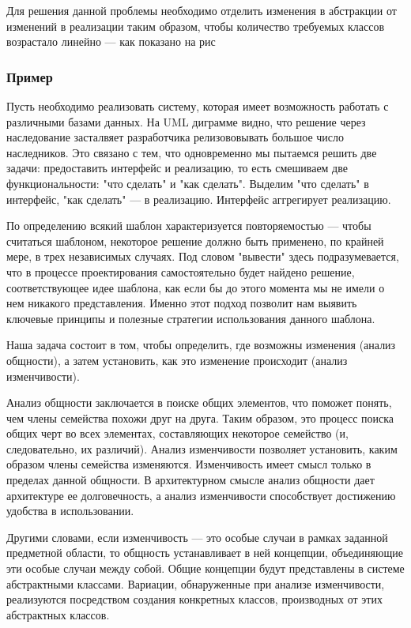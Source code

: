 \documentclass[10pt]{article}
\begin{document}
Для решения данной проблемы необходимо отделить изменения в абстракции от
изменений в реализации таким образом, чтобы количество требуемых классов
возрастало линейно --- как показано на рис
\subsubsection{Пример}
Пусть необходимо реализовать систему, которая имеет возможность работать с различными базами
данных. На UML диграмме видно, что решение через наследование засталвяет разработчика
релизововывать большое число наследников. Это связано с тем, что одновременно мы пытаемся решить
две задачи: предоставить интерфейс и реализацию, то есть смешиваем две функциональности: "что сделать"
и "как сделать". Выделим "что сделать" в интерфейс, "как сделать" --- в реализацию. Интерфейс аггрегирует
реализацию.

По определению всякий шаблон характеризуется повторяемостью --- чтобы считаться шаблоном, некоторое решение должно быть
применено, по крайней мере, в трех независимых случаях. Под словом "вывести" здесь подразумевается, что в процессе
проектирования самостоятельно будет найдено решение, соответствующее идее шаблона, как если бы до этого момента мы
не имели о нем никакого представления. Именно этот подход позволит нам выявить ключевые принципы и полезные
стратегии использования данного шаблона.

Наша задача состоит в том, чтобы определить, где возможны изменения (анализ общности), а затем установить, как это
изменение происходит (анализ изменчивости).

Анализ общности заключается в поиске общих элементов, что поможет понять, чем члены семейства похожи друг на друга.
Таким образом, это процесс поиска общих черт во всех элементах, составляющих некоторое семейство (и, следовательно, их различий).
Анализ изменчивости позволяет установить, каким образом члены семейства изменяются. Изменчивость имеет смысл только в пределах данной общности.
В архитектурном смысле анализ общности дает архитектуре ее долговечность, а анализ изменчивости способствует достижению удобства в использовании.

Другими словами, если изменчивость — это особые случаи в рамках заданной предметной области, то общность устанавливает в ней концепции,
объединяющие эти особые случаи между собой. Общие концепции будут представлены в системе абстрактными классами. Вариации, обнаруженные
при анализе изменчивости, реализуются посредством создания конкретных классов, производных от этих абстрактных классов.
\end{document}
